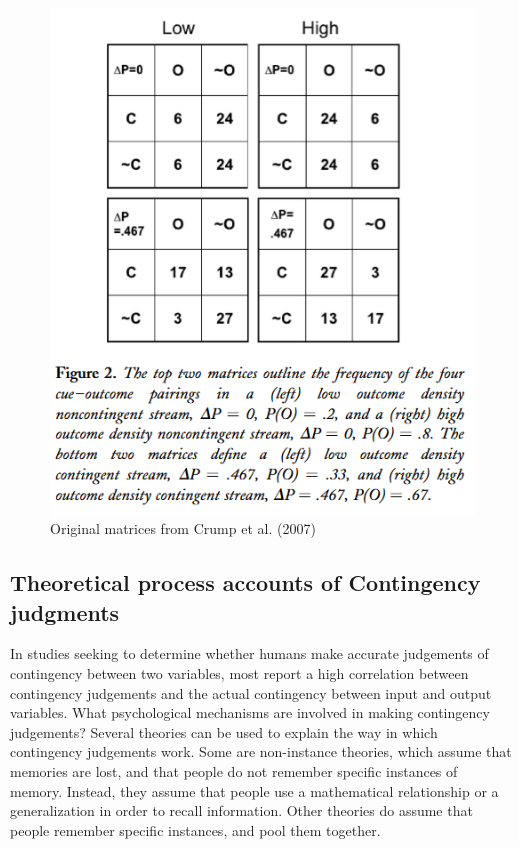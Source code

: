\documentclass[
  english,
  man,floatsintext]{apa6}
\begin{document}
\begin{figure}
\centering
\includegraphics{imgs/crump_figure2.png}
\caption{\label{fig:unnamed-chunk-1}Original matrices from Crump et al. (2007)}
\end{figure}

\hypertarget{theoretical-process-accounts-of-contingency-judgments}{%
\subsection{Theoretical process accounts of Contingency judgments}\label{theoretical-process-accounts-of-contingency-judgments}}

In studies seeking to determine whether humans make accurate judgements of contingency between two variables, most report a high correlation between contingency judgements and the actual contingency between input and output variables. What psychological mechanisms are involved in making contingency judgements? Several theories can be used to explain the way in which contingency judgements work. Some are non-instance theories, which assume that memories are lost, and that people do not remember specific instances of memory. Instead, they assume that people use a mathematical relationship or a generalization in order to recall information. Other theories do assume that people remember specific instances, and pool them together.
\end{document}
